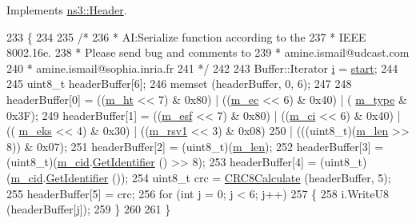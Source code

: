 Implements \hyperlink{classns3_1_1Header_afb61f1aac69ff8349a6bfe521fab5404}{ns3\+::\+Header}.


\begin{DoxyCode}
233 \{
234 
235   \textcolor{comment}{/*}
236 \textcolor{comment}{   * AI:Serialize function according to the}
237 \textcolor{comment}{   * IEEE 8002.16e.}
238 \textcolor{comment}{   * Please send bug and comments to}
239 \textcolor{comment}{   * amine.ismail@udcast.com}
240 \textcolor{comment}{   * amine.ismail@sophia.inria.fr}
241 \textcolor{comment}{   */}
242 
243   Buffer::Iterator \hyperlink{bernuolliDistribution_8m_a6f6ccfcf58b31cb6412107d9d5281426}{i} = \hyperlink{namespacevisualizer_1_1core_a2a35e5d8a34af358b508dac8635754e0}{start};
244 
245   uint8\_t headerBuffer[6];
246   memset (headerBuffer, 0, 6);
247 
248   headerBuffer[0] = ((\hyperlink{classns3_1_1GenericMacHeader_a35c4cce15809ec8472e236d4595693b0}{m\_ht} << 7) & 0x80) | ((\hyperlink{classns3_1_1GenericMacHeader_a926fba749a72e5069afb7dfe0d9b565a}{m\_ec} << 6) & 0x40) | (
      \hyperlink{classns3_1_1GenericMacHeader_ad117be226baa0fd1757cdba611016844}{m\_type} & 0x3F);
249   headerBuffer[1] = ((\hyperlink{classns3_1_1GenericMacHeader_a8326410f7581488e9ad38660fce99eeb}{m\_esf} << 7) & 0x80) | ((\hyperlink{classns3_1_1GenericMacHeader_ac963f44cb95647ccba2d650005f8ed60}{m\_ci} << 6) & 0x40) | ((
      \hyperlink{classns3_1_1GenericMacHeader_afd010ab0a6858a4b354fbe375f9a28a8}{m\_eks} << 4) & 0x30) | ((\hyperlink{classns3_1_1GenericMacHeader_a4a38605264c8e8c6f3e7f28f772f5308}{m\_rsv1} << 3) & 0x08)
250     | (((uint8\_t)(\hyperlink{classns3_1_1GenericMacHeader_a654e7aa3e36a5d055e72ffee0907ce46}{m\_len} >> 8)) & 0x07);
251   headerBuffer[2] = (uint8\_t)(\hyperlink{classns3_1_1GenericMacHeader_a654e7aa3e36a5d055e72ffee0907ce46}{m\_len});
252   headerBuffer[3] = (uint8\_t)(\hyperlink{classns3_1_1GenericMacHeader_aaef3e7fcc428b7efb07fff44159f5606}{m\_cid}.\hyperlink{classns3_1_1Cid_a8745a5cf5b7f2e5d142c4fb79072a053}{GetIdentifier} () >> 8);
253   headerBuffer[4] = (uint8\_t)(\hyperlink{classns3_1_1GenericMacHeader_aaef3e7fcc428b7efb07fff44159f5606}{m\_cid}.\hyperlink{classns3_1_1Cid_a8745a5cf5b7f2e5d142c4fb79072a053}{GetIdentifier} ());
254   uint8\_t crc = \hyperlink{namespacens3_a5329c9897a8f3f61ec901c9d1e61613a}{CRC8Calculate} (headerBuffer, 5);
255   headerBuffer[5] = crc;
256   \textcolor{keywordflow}{for} (\textcolor{keywordtype}{int} j = 0; j < 6; j++)
257     \{
258       i.WriteU8 (headerBuffer[j]);
259     \}
260 
261 \}
\end{DoxyCode}


